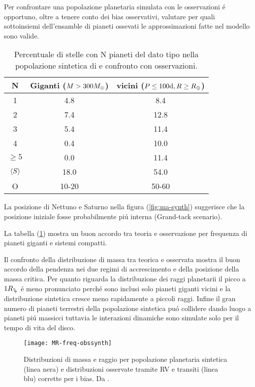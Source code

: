 Per confrontare una popolazione planetaria simulata con le osservazioni \'e opportuno, oltre a tenere conto dei bias osservativi, valutare per quali sottoinsiemi dell'ensamble di pianeti ossevati le approssimazioni fatte nel modello sono valide.


\begin{table}
\begin{tabular}{|ccc|}
\hline
N&Giganti ($M>300M_{\oplus}{}$)&vicini ($P\leq100\si{\day}, R\geq\rearth{}$)\\
\hline
1&4.8&8.4\\
2&7.4&12.8\\
3&5.4&11.4\\
4&0.4&10.0\\
$\geq5$&0.0&11.4\\
$\langle S \rangle$&18.0&54.0\\
O&10-20&50-60\\
\hline
\end{tabular}
\caption{Percentuale di stelle con N pianeti del dato tipo nella popolazione sintetica di \cite{mordasini2018planetary} e confronto con osservazioni.}\label{tab:planetfreq}
\end{table}

La posizione di Nettuno e Saturno nella figura (\ref{fig:ma-synth}) suggerisce che la posizione iniziale fosse probabilmente pi\'u interna (Grand-tack scenario).

La tabella (\ref{tab:planetfreq}) mostra un buon accordo tra teoria e osservazione per frequenza di pianeti giganti e sistemi compatti.

Il confronto della distribuzione di massa tra teorica e osservata mostra il buon accordo della pendenza nei due regimi di accrescimento e della posizione della massa critica. Per quanto riguarda la distribuzione dei raggi planetarii il picco a $1\rjupiter{}$ \'e meno pronunciato perch\'e sono inclusi solo pianeti giganti vicini e la distribuzione sintetica cresce meno rapidamente a piccoli raggi. Infine il gran numero di pianeti terrestri della popolazione sintetica pu\'o collidere dando luogo a pianeti pi\'u massicci tuttavia le interazioni dinamiche sono simulate solo per il tempo di vita del disco.

\begin{figure}[!ht]\texttt{[image: MR-freq-obssynth]}\caption{Distribuzioni di massa e raggio per popolazione planetaria sintetica (linea nera) e distribuzioni osservate tramite RV e transiti (linea blu) corrette per i bias. Da \cite{mordasini2018planetary}.}\label{fig:MR-freq-obssynth}
\end{figure}

